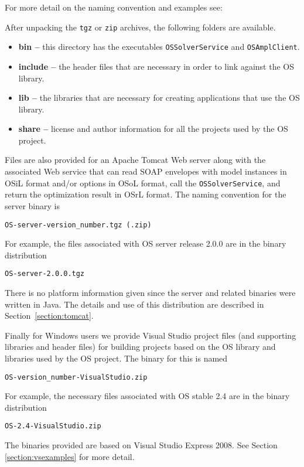 For more detail on the naming convention and examples see:

\medskip
\noindent{\tt\UrlCoinNames}
\medskip

After unpacking the {\tt tgz} or {\tt zip} archives, the following folders are available.
\begin{itemize}

\item[] {\bf bin --} this directory has the executables {\tt OSSolverService} 
and {\tt OSAmplClient}.

\item[]  {\bf include --} the header files that are necessary in order to link against the OS library.

\item[] {\bf lib --} the libraries that are necessary for creating applications that use the OS library.

\item[] {\bf  share --} license and author information for all the projects used by the OS project.
\end{itemize}



Files are also provided for an Apache Tomcat Web server along with the associated Web service
that can
read SOAP  envelopes with model instances in OSiL format and/or options in 
OSoL format, call the {\tt OSSolverService},
and return the optimization result in OSrL format.
The naming convention for the server binary is
\begin{verbatim}
OS-server-version_number.tgz (.zip)
\end{verbatim}
For example, the files associated with  OS server release 2.0.0 are in the binary distribution
\begin{verbatim}
OS-server-2.0.0.tgz
\end{verbatim}
There is no platform information given since the server and related binaries were written in Java.
\ifdevelop
The details and use of this distribution are described in Section~\ref{section:tomcat}.
\fi


Finally for Windows users we provide Visual Studio  project files 
(and supporting libraries and header files) for building projects based on the OS library and libraries 
used by the OS project. The binary for this is named
\begin{verbatim}
OS-version_number-VisualStudio.zip
\end{verbatim}
For example, the necessary files associated with  OS  stable 2.4 
are in the binary distribution
\begin{verbatim}
OS-2.4-VisualStudio.zip
\end{verbatim}
The binaries provided are based on Visual Studio Express 2008.  
\ifdevelop See Section \ref{section:vsexamples} for more detail.\fi
